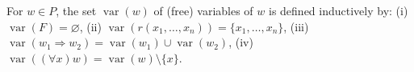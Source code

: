 For $w \in P$, the set $\operatorname{var}(w)$ of (free) variables of $w$ is defined inductively by:
(i) $\operatorname{var}(F) = \varnothing$,
(ii) $\operatorname{var}(r(x_1, \ldots, x_n)) = \{x_1, \ldots, x_n\}$,
(iii) $\operatorname{var}(w_1 \Rightarrow w_2) = \operatorname{var}(w_1) \cup \operatorname{var}(w_2)$,
(iv) $\operatorname{var}((\forall x)w) = \operatorname{var}(w) \setminus \{x\}$.
